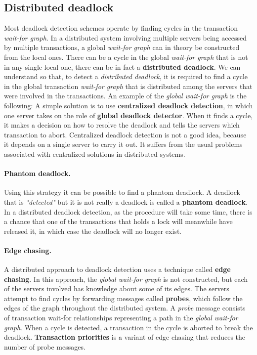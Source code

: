 \subsection{Distributed deadlock}
Most deadlock detection schemes operate by finding cycles in the transaction \textit{wait-for graph}. In a distributed system involving multiple servers being accessed by multiple transactions, a global \textit{wait-for graph} can in theory be constructed from the local ones. There can be a cycle in the global \textit{wait-for graph} that is not in any single local one, there can be in fact a \textbf{distributed deadlock}. We can understand so that, to detect a \textit{distributed deadlock}, it is required to find a cycle in the global transaction \textit{wait-for graph} that is distributed among the servers that were involved in the transactions. An example of the \textit{global wait-for graph} is the following:
A simple solution is to use \textbf{centralized deadlock detection}, in which one server takes on the role of \textbf{global deadlock detector}. When it finds a cycle, it makes a decision on how to resolve the deadlock and tells the servers which transaction to abort. Centralized deadlock detection is not a good idea, because it depends on a single server to carry it out. It suffers from the usual problems associated with centralized solutions in distributed systems.

\paragraph*{Phantom deadlock.} Using this strategy it can be possible to find a phantom deadlock. A deadlock that is \textit{"detected"} but it is not really a deadlock is called a \textbf{phantom deadlock}. In a distributed deadlock detection, as the procedure will take some time, there is a chance that one of the transactions that holds a lock will meanwhile have released it, in which case the deadlock will no longer exist.

\paragraph*{Edge chasing.} A distributed approach to deadlock detection uses a technique called \textbf{edge chasing}. In this approach, the \textit{global wait-for graph} is not constructed, but each of the servers involved has knowledge about some of its edges. The servers attempt to find cycles by forwarding messages called \textbf{probes}, which follow the edges of the graph throughout the distributed system. A \textit{probe} message consists of transaction wait-for relationships representing a path in the \textit{global wait-for graph}. When a cycle is detected, a transaction in the cycle is aborted to break the deadlock. \textbf{Transaction priorities} is a variant of edge chasing that reduces the number of probe messages.

